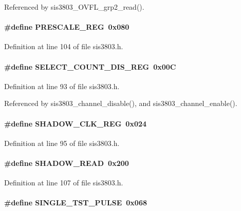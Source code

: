 Referenced by sis3803\_\-OVFL\_\-grp2\_\-read().
\paragraph[{PRESCALE\_\-REG}]{\setlength{\rightskip}{0pt plus 5cm}\#define PRESCALE\_\-REG~0x080}\hfill\label{sis3803_8h_af05806eed98b2804b0afb2207456bda6}


Definition at line 104 of file sis3803.h.
\paragraph[{SELECT\_\-COUNT\_\-DIS\_\-REG}]{\setlength{\rightskip}{0pt plus 5cm}\#define SELECT\_\-COUNT\_\-DIS\_\-REG~0x00C}\hfill\label{sis3803_8h_a909ee16848af11183cbe6a427279ae28}


Definition at line 93 of file sis3803.h.

Referenced by sis3803\_\-channel\_\-disable(), and sis3803\_\-channel\_\-enable().
\paragraph[{SHADOW\_\-CLK\_\-REG}]{\setlength{\rightskip}{0pt plus 5cm}\#define SHADOW\_\-CLK\_\-REG~0x024}\hfill\label{sis3803_8h_afded3e07a1e6f1d14bd825afabc29ed9}


Definition at line 95 of file sis3803.h.
\paragraph[{SHADOW\_\-READ}]{\setlength{\rightskip}{0pt plus 5cm}\#define SHADOW\_\-READ~0x200}\hfill\label{sis3803_8h_adb7bb3d52b0584d0a1570888ed7b6b19}


Definition at line 107 of file sis3803.h.
\paragraph[{SINGLE\_\-TST\_\-PULSE}]{\setlength{\rightskip}{0pt plus 5cm}\#define SINGLE\_\-TST\_\-PULSE~0x068}\hfill\label{sis3803_8h_aacda973ba25737221c3173394a3cd3b4}



